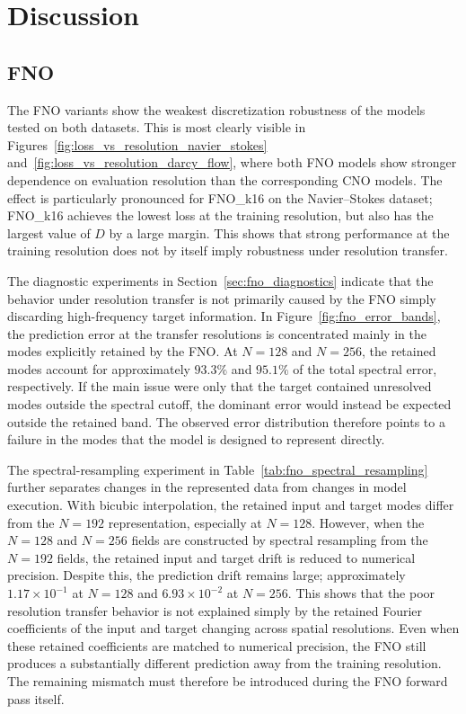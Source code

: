 \section{Discussion}

\subsection{FNO}\label{sec:fno_discussion}

The FNO variants show the weakest discretization robustness of the models tested on both datasets. This is most clearly visible in Figures~\ref{fig:loss_vs_resolution_navier_stokes} and~\ref{fig:loss_vs_resolution_darcy_flow}, where both FNO models show stronger dependence on evaluation resolution than the corresponding CNO models. The effect is particularly pronounced for FNO\_k16 on the Navier--Stokes dataset; FNO\_k16 achieves the lowest loss at the training resolution, but also has the largest value of \(D\) by a large margin. This shows that strong performance at the training resolution does not by itself imply robustness under resolution transfer.

The diagnostic experiments in Section~\ref{sec:fno_diagnostics} indicate that the behavior under resolution transfer is not primarily caused by the FNO simply discarding high-frequency target information. In Figure~\ref{fig:fno_error_bands}, the prediction error at the transfer resolutions is concentrated mainly in the modes explicitly retained by the FNO. At \(N=128\) and \(N=256\), the retained modes account for approximately \(93.3\%\) and \(95.1\%\) of the total spectral error, respectively. If the main issue were only that the target contained unresolved modes outside the spectral cutoff, the dominant error would instead be expected outside the retained band. The observed error distribution therefore points to a failure in the modes that the model is designed to represent directly. 

The spectral-resampling experiment in Table~\ref{tab:fno_spectral_resampling} further separates changes in the represented data from changes in model execution. With bicubic interpolation, the retained input and target modes differ from the \(N=192\) representation, especially at \(N=128\). However, when the \(N=128\) and \(N=256\) fields are constructed by spectral resampling from the \(N=192\) fields, the retained input and target drift is reduced to numerical precision. Despite this, the prediction drift remains large; approximately \(1.17\times10^{-1}\) at \(N=128\) and \(6.93\times10^{-2}\) at \(N=256\). This shows that the poor resolution transfer behavior is not explained simply by the retained Fourier coefficients of the input and target changing across spatial resolutions. Even when these retained coefficients are matched to numerical precision, the FNO still produces a substantially different prediction away from the training resolution. The remaining mismatch must therefore be introduced during the FNO forward pass itself.


